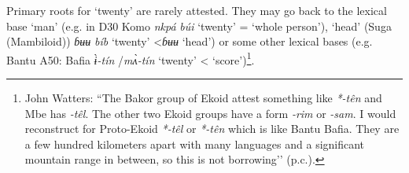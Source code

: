 Primary roots for `twenty' are rarely attested. They may go back to the lexical base `man' (e.g. in D30 Komo \textit{nkpá} \textit{búi} ‘twenty’ = ‘whole person’), `head' (Suga (Mambiloid)) \textit{ɓʉʉ} \textit{bíb} ‘twenty’ <\textit{ɓʉʉ} ‘head’) or some other lexical bases (e.g. Bantu A50: Bafia \textit{{\`{ɨ}}-tín} /\textit{m{\`{ʌ}}-tín} ‘twenty’ < `score')\footnote{John Watters: “The Bakor group of Ekoid attest something like \textit{*-t{\^{e}}n} and Mbe has \textit{-t{\^{e}}l}. The other two Ekoid groups have a form \textit{-rim} or \textit{-sam}. I would reconstruct for Proto-Ekoid \textit{*-t{\^{e}}l} or \textit{*-t{\^{e}}n} which is like Bantu Bafia. They are a few hundred kilometers apart with many languages and a significant mountain range in between, so this is not borrowing’’ (p.c.).}. 

 
